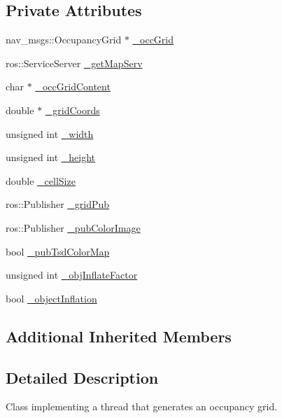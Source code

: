 \subsection*{Private Attributes}
\begin{DoxyCompactItemize}
\item 
nav\-\_\-msgs\-::\-Occupancy\-Grid $\ast$ \hyperlink{classohm__tsd__slam__ref_1_1ThreadGrid_aabac708b71745a854f552156b8aef2ae}{\-\_\-occ\-Grid}
\item 
ros\-::\-Service\-Server \hyperlink{classohm__tsd__slam__ref_1_1ThreadGrid_aa37d0527a25f70d3e6869229b6808810}{\-\_\-get\-Map\-Serv}
\item 
char $\ast$ \hyperlink{classohm__tsd__slam__ref_1_1ThreadGrid_a3e1350e3d4943ab408ae9b0935300972}{\-\_\-occ\-Grid\-Content}
\item 
double $\ast$ \hyperlink{classohm__tsd__slam__ref_1_1ThreadGrid_a01adc5e95f879fbed0686a008a44ea86}{\-\_\-grid\-Coords}
\item 
unsigned int \hyperlink{classohm__tsd__slam__ref_1_1ThreadGrid_a4e18fa3923e4a016ad2ca963ccd318d7}{\-\_\-width}
\item 
unsigned int \hyperlink{classohm__tsd__slam__ref_1_1ThreadGrid_a549634eab5110b6b3f0ce5bf5ee82fca}{\-\_\-height}
\item 
double \hyperlink{classohm__tsd__slam__ref_1_1ThreadGrid_a91bad701055d367eefe1e4b3639a71fd}{\-\_\-cell\-Size}
\item 
ros\-::\-Publisher \hyperlink{classohm__tsd__slam__ref_1_1ThreadGrid_a6a7f8db27c4cee799aaf328caacd2bdf}{\-\_\-grid\-Pub}
\item 
ros\-::\-Publisher \hyperlink{classohm__tsd__slam__ref_1_1ThreadGrid_a86ea0357d397f91ef76eb40389fb55e0}{\-\_\-pub\-Color\-Image}
\item 
bool \hyperlink{classohm__tsd__slam__ref_1_1ThreadGrid_a2b8fe225e961331b72894697f1a8b120}{\-\_\-pub\-Tsd\-Color\-Map}
\item 
unsigned int \hyperlink{classohm__tsd__slam__ref_1_1ThreadGrid_a0e9769acfadae7638005529607d7ff79}{\-\_\-obj\-Inflate\-Factor}
\item 
bool \hyperlink{classohm__tsd__slam__ref_1_1ThreadGrid_a2eef7cdb2d93710b69cd4858a7e7d337}{\-\_\-object\-Inflation}
\end{DoxyCompactItemize}
\subsection*{Additional Inherited Members}


\subsection{Detailed Description}
Class implementing a thread that generates an occupancy grid. 

